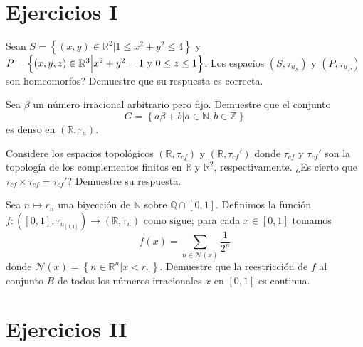 \documentclass[12pt]{report}
\theoremstyle{largebreak}
\newcommand\cf[3]{\ensuremath{#1:#2\rightarrow#3}}
\begin{document}
    \section{Ejercicios I}

    \begin{excer}
        Sean $S=\left\{(x,y)\in\mathbb{R}^2\Big|1\leq x^2+y^2\leq 4 \right\}$ y $P=\left\{(x,y,z)\in\mathbb{R}^3\Big|x^2+y^2=1\textup{ y }0\leq z\leq 1 \right\}$. Los espacios $(S,\tau_{u_S})$ y $(P,\tau_{u_P})$ son homeomorfos? Demuestre que su respuesta es correcta.
    \end{excer}

    \begin{excer}
        Sea $\beta$ un número irracional arbitrario pero fijo. Demuestre que el conjunto 
        \begin{equation*}
            G=\left\{a\beta+b\Big|a\in\mathbb{N},b\in\mathbb{Z} \right\}
        \end{equation*}
        es denso en $(\mathbb{R},\tau_u)$.
    \end{excer}

    \begin{excer}
        Considere los espacios topológicos $(\mathbb{R},\tau_{cf})$ y $(\mathbb{R},\tau_{cf}')$ donde $\tau_{cf}$ y $\tau_{cf}'$ son la topología de los complementos finitos en $\mathbb{R}$ y $\mathbb{R}^2$, respectivamente. ¿Es cierto que $\tau_{cf}\times\tau_{cf}=\tau_{cf}'$? Demuestre su respuesta.
    \end{excer}

    \begin{excer}
        Sea $n\mapsto r_n$ una biyección de $\mathbb{N}$ sobre $\mathbb{Q}\cap [0,1]$. Definimos la función $\cf{f}{([0,1],\tau_{u_{[0,1]}})}{(\mathbb{R},\tau_u)}$ como sigue; para cada $x\in [0,1]$ tomamos 
        \begin{equation*}
            f(x)=\sum_{n\in\mathcal{N}(x) }\frac{1}{2^n}
        \end{equation*}
        donde $\mathcal{N}(x)=\left\{n\in\mathbb{R}^n\Big|x<r_n \right\}$. Demuestre que la reestricción de $f$ al conjunto $B$ de todos los números irracionales $x$ en $[0,1]$ es continua.
    \end{excer}

    \section{Ejercicios II}

    \begin{excer}
        
    \end{excer}
\end{document}
